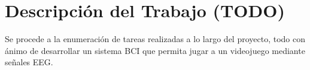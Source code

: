 \chapter{Descripción del Trabajo (TODO)}
\label{cap:descripcionTrabajo}

Se procede a la enumeración de tareas realizadas a lo largo del proyecto, todo con ánimo de desarrollar un sistema BCI que permita jugar a un videojuego mediante señales EEG.








